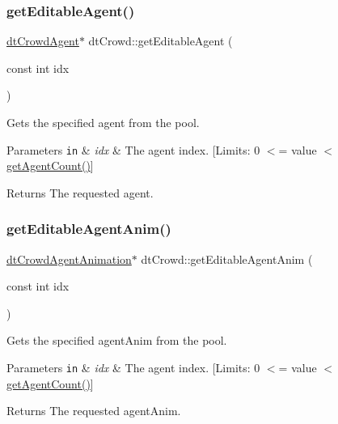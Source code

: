 \subsubsection{\texorpdfstring{get\+Editable\+Agent()}{getEditableAgent()}\hspace{0.1cm}{\footnotesize\ttfamily [2/2]}}
{\footnotesize\ttfamily \hyperlink{structdtCrowdAgent}{dt\+Crowd\+Agent}$\ast$ dt\+Crowd\+::get\+Editable\+Agent (\begin{DoxyParamCaption}\item[{const int}]{idx }\end{DoxyParamCaption})}

Gets the specified agent from the pool. 
\begin{DoxyParams}[1]{Parameters}
\mbox{\tt in}  & {\em idx} & The agent index. \mbox{[}Limits\+: 0 $<$= value $<$ \hyperlink{classdtCrowd_a87dc2372038ee12d9043a65737880b78}{get\+Agent\+Count()}\mbox{]} \\
\hline
\end{DoxyParams}
\begin{DoxyReturn}{Returns}
The requested agent. 
\end{DoxyReturn}
\mbox{\label{classdtCrowd_a4fc0c4eaff286ae37cb0c2b987174e56}} 
\subsubsection{\texorpdfstring{get\+Editable\+Agent\+Anim()}{getEditableAgentAnim()}\hspace{0.1cm}{\footnotesize\ttfamily [1/2]}}
{\footnotesize\ttfamily \hyperlink{structdtCrowdAgentAnimation}{dt\+Crowd\+Agent\+Animation}$\ast$ dt\+Crowd\+::get\+Editable\+Agent\+Anim (\begin{DoxyParamCaption}\item[{const int}]{idx }\end{DoxyParamCaption})}

Gets the specified agent\+Anim from the pool. 
\begin{DoxyParams}[1]{Parameters}
\mbox{\tt in}  & {\em idx} & The agent index. \mbox{[}Limits\+: 0 $<$= value $<$ \hyperlink{classdtCrowd_a87dc2372038ee12d9043a65737880b78}{get\+Agent\+Count()}\mbox{]} \\
\hline
\end{DoxyParams}
\begin{DoxyReturn}{Returns}
The requested agent\+Anim. 
\end{DoxyReturn}
\mbox{\label{classdtCrowd_aa8cc112f7a11e13a4f8e4584d417eb9d}} 
